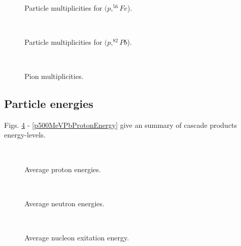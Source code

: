 \begin{figure}
  \begin{center}
    \leavevmode
    \mbox{\epsfxsize=8cm  }
       \caption{Particle multiplicities for $(p, ^{56}Fe$).}
  \label{pFeMultiplicity}
  \end{center}
\end{figure}


\begin{figure}
  \begin{center}
    \leavevmode
    \mbox{\epsfxsize=8cm  }
       \caption{Particle multiplicities for $(p, ^{82}Pb$).}
  \label{pPbMultiplicity}
  \end{center}
\end{figure}


\begin{figure}
  \begin{center}
    \leavevmode
    \mbox{\epsfxsize=8cm  }
       \caption{Pion multiplicities.}
  \label{pPbPionMultiplicity}
  \end{center}
\end{figure}



\subsection{Particle energies}

Figs. \ref{pPbProtonEnergy} - \ref{p500MeVPbProtonEnergy} give an summary of cascade products energy-levels.

\begin{figure}
  \begin{center}
    \leavevmode
    \mbox{\epsfxsize=8cm  }
       \caption{Average proton energies.}
  \label{pPbProtonEnergy}
  \end{center}
\end{figure}


\begin{figure}
  \begin{center}
    \leavevmode
    \mbox{\epsfxsize=8cm  }
       \caption{Average neutron energies.}
  \label{pPbNeutronEnergy}
  \end{center}
\end{figure}


\begin{figure}
  \begin{center}
    \leavevmode
    \mbox{\epsfxsize=8cm  }
       \caption{Average nucleon exitation energy.}
  \label{pPbNucleonExitation}
  \end{center}
\end{figure}


